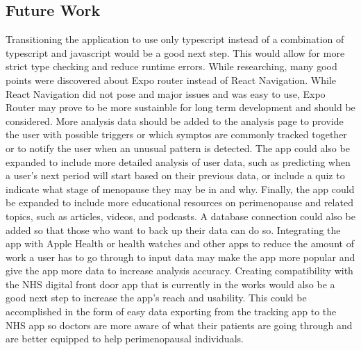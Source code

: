 \subsection{Future Work}
Transitioning the application to use only typescript instead of a combination of typescript and javascript would be a good next step. This would allow for more strict type checking and reduce runtime errors. While researching, many good points were discovered about Expo router instead of React Navigation. While React Navigation did not pose and major issues and was easy to use, Expo Router may prove to be more sustainble for long term development and should be considered. More analysis data should be added to the analysis page to provide the user with possible triggers or which symptos are commonly tracked together or to notify the user when an unusual pattern is detected. The app could also be expanded to include more detailed analysis of user data, such as predicting when a user's next period will start based on their previous data, or include a quiz to indicate what stage of menopause they may be in and why. Finally, the app could be expanded to include more educational resources on perimenopause and related topics, such as articles, videos, and podcasts. A database connection could also be added so that those who want to back up their data can do so. Integrating the app with Apple Health or health watches and other apps to reduce the amount of work a user has to go through to input data may make the app more popular and give the app more data to increase analysis accuracy. Creating compatibility with the NHS digital front door app that is currently in the works would also be a good next step to increase the app's reach and usability. This could be accomplished in the form of easy data exporting from the tracking app to the NHS app so doctors are more aware of what their patients are going through and are better equipped to help perimenopausal individuals.

